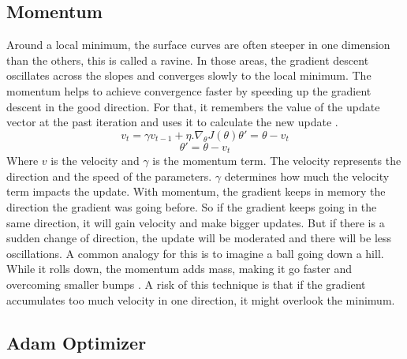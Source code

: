 \subsection{Momentum}
Around a local minimum, the surface curves are often steeper in one dimension than the others, this is called a ravine. In those areas, the gradient descent oscillates across the slopes and converges slowly to the local minimum. The momentum helps to achieve convergence faster by speeding up the gradient descent in the good direction. For that, it remembers the value of the update vector at the past iteration and uses it to calculate the new update \cite{optimgrad}. 
\begin{equation}
    v_t = \gamma v_{t-1} + \eta . \nabla_\theta J(\theta)
    \theta' = \theta - v_t
\end{equation}
\begin{equation}
    \theta' = \theta - v_t
\end{equation}
Where \(v\) is the velocity and \(\gamma\) is the momentum term. The velocity represents the direction and the speed of the parameters. \(\gamma\) determines how much the velocity term impacts the update. With momentum, the gradient keeps in memory the direction the gradient was going before. So if the gradient keeps going in the same direction, it will gain velocity and make bigger updates. But if there is a sudden change of direction, the update will be moderated and there will be less oscillations. A common analogy for this is to imagine a ball going down a hill. While it rolls down, the momentum adds mass, making it go faster and overcoming smaller bumps \cite{optimgrad}. A risk of this technique is that if the gradient accumulates too much velocity in one direction, it might overlook the minimum. 

\subsection{Adam Optimizer}

